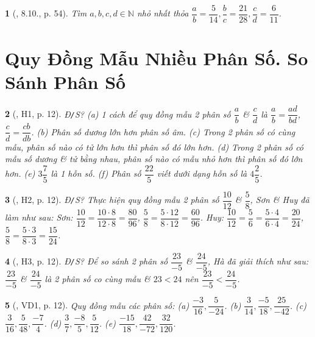 \documentclass{article}
\newtheorem{baitoan}{}
\begin{document}
\begin{baitoan}[\cite{TLCT_THCS_Toan_6_so_hoc}, 8.10., p. 54]
	Tìm $a,b,c,d\in\mathbb{N}$ nhỏ nhất thỏa $\dfrac{a}{b} = \dfrac{5}{14},\dfrac{b}{c} = \dfrac{21}{28},\dfrac{c}{d} = \dfrac{6}{11}$.
\end{baitoan}


\section{Quy Đồng Mẫu Nhiều Phân Số. So Sánh Phân Số}

\begin{baitoan}[\cite{Binh_boi_duong_Toan_6_tap_2}, H1, p. 12]
	{\rm Đ{\tt/}S?} (a) 1 cách để quy đồng mẫu 2 phân số $\dfrac{a}{b}$ \& $\dfrac{c}{d}$ là $\dfrac{a}{b} = \dfrac{ad}{bd}$, $\dfrac{c}{d} = \dfrac{cb}{db}$. (b) Phân số dương lớn hơn phân số âm. (c) Trong 2 phân số có cùng mẫu, phân số nào có tử lớn hơn thì phân số đó lớn hơn. (d) Trong 2 phân số có mẫu số dương \& tử bằng nhau, phân số nào có mẫu nhỏ hơn thì phân số đó lớn hơn. (e) $3\dfrac{7}{5}$ là 1 hỗn số. (f) Phân số $\dfrac{22}{5}$ viết dưới dạng hỗn số là $4\dfrac{2}{5}$.
\end{baitoan}

\begin{baitoan}[\cite{Binh_boi_duong_Toan_6_tap_2}, H2, p. 12]
	{\rm Đ{\tt/}S?} Thực hiện quy đồng mẫu 2 phân số $\dfrac{10}{12}$ \& $\dfrac{5}{8}$, Sơn \& Huy đã làm như sau: Sơn: $\dfrac{10}{12} = \dfrac{10\cdot8}{12\cdot8} = \dfrac{80}{96}$, $\dfrac{5}{8} = \dfrac{5\cdot12}{8\cdot12} = \dfrac{60}{96}$. Huy: $\dfrac{10}{12} = \dfrac{5}{6} = \dfrac{5\cdot4}{6\cdot4} = \dfrac{20}{24}$, $\dfrac{5}{8} = \dfrac{5\cdot3}{8\cdot3} = \dfrac{15}{24}$.
\end{baitoan}

\begin{baitoan}[\cite{Binh_boi_duong_Toan_6_tap_2}, H3, p. 12]
	{\rm Đ{\tt/}S?} Để so sánh 2 phân số $\dfrac{23}{-5}$ \&  $\dfrac{24}{-5}$, Hà đã giải thích như sau: $\dfrac{23}{-5}$ \&  $\dfrac{24}{-5}$ là 2 phân số co cùng mẫu \& $23 < 24$ nên $\dfrac{23}{-5} < \dfrac{24}{-5}$.
\end{baitoan}

\begin{baitoan}[\cite{Binh_boi_duong_Toan_6_tap_2}, VD1, p. 12]
	Quy đồng mẫu các phân số: (a) $\dfrac{-3}{16},\dfrac{5}{-24}$. (b) $\dfrac{3}{14},\dfrac{-5}{18},\dfrac{25}{-42}$. (c) $\dfrac{3}{16},\dfrac{5}{48},\dfrac{-7}{4}$. (d) $\dfrac{3}{7},\dfrac{-8}{5},\dfrac{5}{12}$. (e) $\dfrac{-15}{18},\dfrac{42}{-72},\dfrac{32}{120}$.
\end{baitoan}
\end{document}
